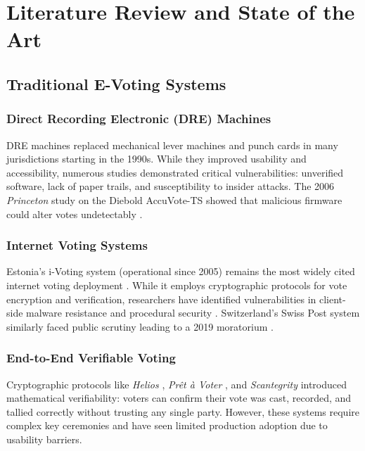 \chapter{Literature Review and State of the Art}
\label{ch:literature}

\section{Traditional E-Voting Systems}
\label{sec:traditional-evoting}

\subsection{Direct Recording Electronic (DRE) Machines}
DRE machines replaced mechanical lever machines and punch cards in many jurisdictions
starting in the 1990s. While they improved usability and accessibility, numerous
studies \cite{kohno2004analysis, appel2009security} demonstrated critical vulnerabilities:
unverified software, lack of paper trails, and susceptibility to insider attacks.
The 2006 \textit{Princeton} study on the Diebold AccuVote-TS showed that malicious
firmware could alter votes undetectably \cite{felten2006security}.

\subsection{Internet Voting Systems}
Estonia's i-Voting system (operational since 2005) remains the most widely cited
internet voting deployment \cite{heiberg2011verifiability}. While it employs
cryptographic protocols for vote encryption and verification, researchers have
identified vulnerabilities in client-side malware resistance and procedural
security \cite{springall2014security}. Switzerland's Swiss Post system similarly
faced public scrutiny leading to a 2019 moratorium \cite{haenni2017swiss}.

\subsection{End-to-End Verifiable Voting}
Cryptographic protocols like \textit{Helios} \cite{adida2008helios}, \textit{Prêt à Voter}
\cite{ryan2009pret}, and \textit{Scantegrity} \cite{chaum2008scantegrity} introduced
mathematical verifiability: voters can confirm their vote was cast, recorded, and
tallied correctly without trusting any single party. However, these systems require
complex key ceremonies and have seen limited production adoption due to usability
barriers.

